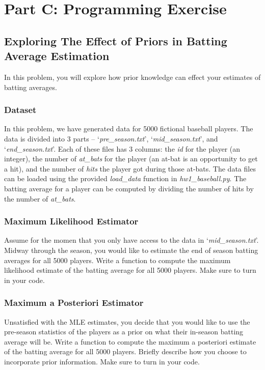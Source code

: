 \documentclass{article}
\begin{document}
\newpage

\section*{Part C: Programming Exercise}

\subsection*{Exploring The Effect of Priors in Batting Average Estimation}

In this problem, you will explore how prior knowledge can effect your estimates of batting averages.

\subsubsection*{Dataset}

In this problem, we have generated data for 5000 fictional baseball players. The data is divided into 3 parts -- `\textit{pre\_season.txt}', `\textit{mid\_season.txt}', and `\textit{end\_season.txt}'. Each of these files has 3 columns: the \textit{id} for the player (an integer), the number of \textit{at\_bats} for the player (an at-bat is an opportunity to get a hit), and the number of \textit{hits} the player got during those at-bats. The data files can be loaded using the provided \textit{load\_data} function in \textit{hw1\_baseball.py}. The batting average for a player can be computed by dividing the number of hits by the number of \textit{at\_bats}.

\subsubsection*{Maximum Likelihood Estimator}

Assume for the momen that you only have access to the data in `\textit{mid\_season.txt}'. Midway through the season, you would like to estimate the end of season batting averages for all 5000 players. Write a function to compute the maximum likelihood estimate of the batting average for all 5000 players. Make sure to turn in your code.

\subsubsection*{Maximum a Posteriori Estimator}

Unsatisfied with the MLE estimates, you decide that you would like to use the pre-season statistics of the players as a prior on what their in-season batting average will be. Write a function to compute the maximum a posteriori estimate of the batting average for all 5000 players. Briefly describe how you choose to incorporate prior information. Make sure to turn in your code.
\end{document}
